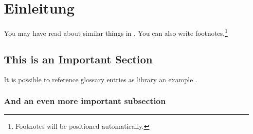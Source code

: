 \chapter{Einleitung}\label{ch:intro}

You may have read about similar things in \cite{wickerReedSolomonCodes1994}.
You can also write footnotes.\footnote{Footnotes will be positioned automatically.}


\section{This is an Important Section}

It is possible to reference glossary entries as \gls{library} an example \cite{reedPolynomialCodesCertain1960}.

\subsection{And an even more important subsection}
